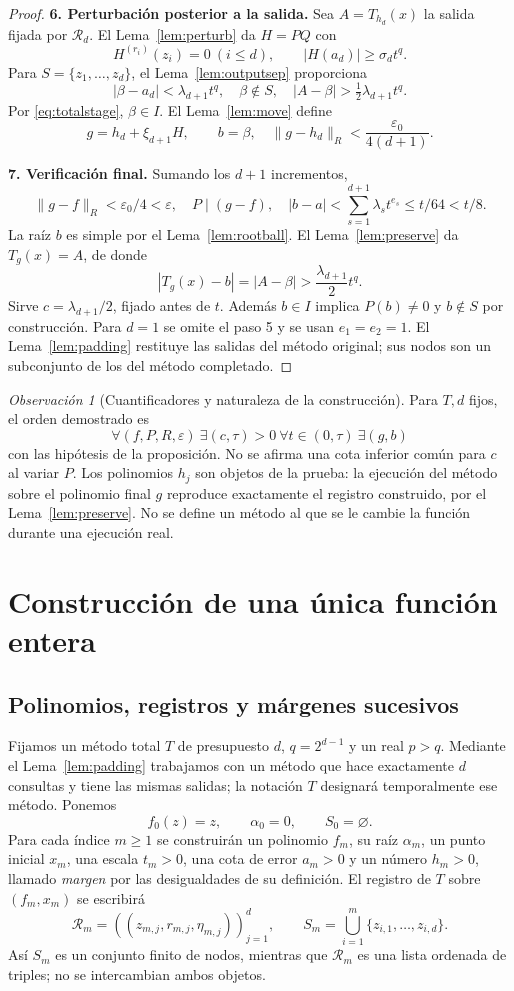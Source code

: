 \documentclass[11pt,a4paper]{article}
\numberwithin{equation}{section}
\theoremstyle{definition}
\theoremstyle{remark}
\newtheorem{remark}[theorem]{Observación}
\newcommand{\Rec}{\mathcal R}
\newcommand{\paso}[1]{\par\smallskip\noindent\textbf{#1}\quad}
\begin{document}
\begin{proof}
\paso{6. Perturbación posterior a la salida.}
Sea $A=T_{h_d}(x)$ la salida fijada por $\Rec_d$. El Lema~\ref{lem:perturb} da $H=PQ$ con
\[
H^{(r_i)}(z_i)=0\ (i\le d),\qquad |H(a_d)|\ge\sigma_dt^q.
\]
Para $S=\{z_1,\ldots,z_d\}$, el Lema~\ref{lem:outputsep} proporciona
\[
|\beta-a_d|<\lambda_{d+1}t^q,\quad\beta\notin S,
\quad|A-\beta|>\tfrac12\lambda_{d+1}t^q.
\]
Por \eqref{eq:totalstage}, $\beta\in I$. El Lema~\ref{lem:move} define
\[
g=h_d+\xi_{d+1}H,\qquad b=\beta,
\quad\|g-h_d\|_R<\frac{\varepsilon_0}{4(d+1)}.
\]
\paso{7. Verificación final.}
Sumando los $d+1$ incrementos,
\[
\|g-f\|_R<\varepsilon_0/4<\varepsilon,\quad P\mid(g-f),\quad
|b-a|<\sum_{s=1}^{d+1}\lambda_st^{e_s}\le t/64<t/8.
\]
La raíz $b$ es simple por el Lema~\ref{lem:rootball}. El Lema~\ref{lem:preserve} da $T_g(x)=A$, de donde
\[
|T_g(x)-b|=|A-\beta|>\frac{\lambda_{d+1}}2t^q.
\]
Sirve $c=\lambda_{d+1}/2$, fijado antes de $t$. Además $b\in I$ implica $P(b)\ne0$ y $b\notin S$ por construcción. Para $d=1$ se omite el paso 5 y se usan $e_1=e_2=1$. El Lema~\ref{lem:padding} restituye las salidas del método original; sus nodos son un subconjunto de los del método completado.
\end{proof}

\begin{remark}[Cuantificadores y naturaleza de la construcción]\label{rem:quantifiers}
Para $T,d$ fijos, el orden demostrado es
\[
\forall(f,P,R,\varepsilon)\ \exists(c,\tau)>0\ 
\forall t\in(0,\tau)\ \exists(g,b)
\]
con las hipótesis de la proposición. No se afirma una cota inferior común para $c$ al variar $P$. Los polinomios $h_j$ son objetos de la prueba: la ejecución del método sobre el polinomio final $g$ reproduce exactamente el registro construido, por el Lema~\ref{lem:preserve}. No se define un método al que se le cambie la función durante una ejecución real.
\end{remark}

\clearpage
\section{Construcción de una única función entera}\label{sec:limit}

\subsection{Polinomios, registros y márgenes sucesivos}
Fijamos un método total $T$ de presupuesto $d$, $q=2^{d-1}$ y un real $p>q$. Mediante el Lema~\ref{lem:padding} trabajamos con un método que hace exactamente $d$ consultas y tiene las mismas salidas; la notación $T$ designará temporalmente ese método. Ponemos
\[
f_0(z)=z,\qquad\alpha_0=0,\qquad S_0=\varnothing.
\]
Para cada índice $m\ge1$ se construirán un polinomio $f_m$, su raíz $\alpha_m$, un punto inicial $x_m$, una escala $t_m>0$, una cota de error $a_m>0$ y un número $h_m>0$, llamado \emph{margen} por las desigualdades de su definición. El registro de $T$ sobre $(f_m,x_m)$ se escribirá
\[
\Rec_m=((z_{m,j},r_{m,j},\eta_{m,j}))_{j=1}^{d},
\qquad
S_m=\bigcup_{i=1}^{m}\{z_{i,1},\ldots,z_{i,d}\}.
\]
Así $S_m$ es un conjunto finito de nodos, mientras que $\Rec_m$ es una lista ordenada de triples; no se intercambian ambos objetos.
\end{document}
